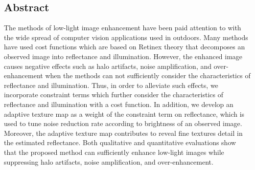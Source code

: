 \begin{center}
\section*{Abstract}
\end{center}
The methods of low-light image enhancement have been paid attention to with the wide spread of computer vision applications used in outdoors. Many methods have used cost functions which are based on Retinex theory that decomposes an observed image into reflectance and illumination. However, the enhanced image causes negative effects such as halo artifacts, noise amplification, and over-enhancement when the methods can not sufficiently consider the characteristics of reflectance and illumination. Thus, in order to alleviate such effects, we incorporate constraint terms which further consider the characteristics of reflectance and illumination with a cost function. In addition, we develop an adaptive texture map as a weight of the constraint term on reflectance, which is used to tune noise reduction rate according to brightness of an observed image. Moreover, the adaptive texture map contributes to reveal fine textures detail in the estimated reflectance. Both qualitative and quantitative evaluations show that the proposed method can sufficiently enhance low-light images while suppressing halo artifacts, noise amplification, and over-enhancement.